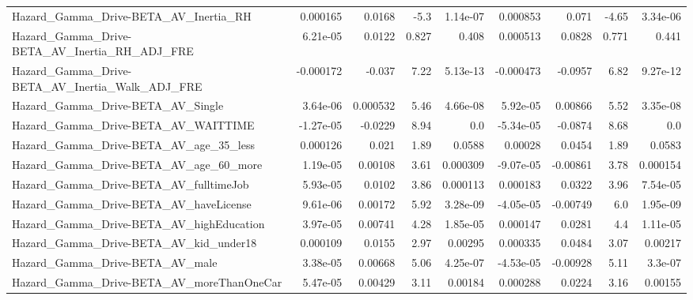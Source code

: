 \begin{tabular}{lrrrrrrrr}
Hazard\_Gamma\_Drive-BETA\_AV\_Inertia\_RH              &    0.000165 &       0.0168 &     -5.3 & 1.14e-07 &   0.000853 &       0.071 &        -4.65 &      3.34e-06 \\
Hazard\_Gamma\_Drive-BETA\_AV\_Inertia\_RH\_ADJ\_FRE      &    6.21e-05 &       0.0122 &    0.827 &    0.408 &   0.000513 &      0.0828 &        0.771 &         0.441 \\
Hazard\_Gamma\_Drive-BETA\_AV\_Inertia\_Walk\_ADJ\_FRE    &   -0.000172 &       -0.037 &     7.22 & 5.13e-13 &  -0.000473 &     -0.0957 &         6.82 &      9.27e-12 \\
Hazard\_Gamma\_Drive-BETA\_AV\_Single                  &    3.64e-06 &     0.000532 &     5.46 & 4.66e-08 &   5.92e-05 &     0.00866 &         5.52 &      3.35e-08 \\
Hazard\_Gamma\_Drive-BETA\_AV\_WAITTIME                &   -1.27e-05 &      -0.0229 &     8.94 &      0.0 &  -5.34e-05 &     -0.0874 &         8.68 &           0.0 \\
Hazard\_Gamma\_Drive-BETA\_AV\_age\_35\_less             &    0.000126 &        0.021 &     1.89 &   0.0588 &    0.00028 &      0.0454 &         1.89 &        0.0583 \\
Hazard\_Gamma\_Drive-BETA\_AV\_age\_60\_more             &    1.19e-05 &      0.00108 &     3.61 & 0.000309 &  -9.07e-05 &    -0.00861 &         3.78 &      0.000154 \\
Hazard\_Gamma\_Drive-BETA\_AV\_fulltimeJob             &    5.93e-05 &       0.0102 &     3.86 & 0.000113 &   0.000183 &      0.0322 &         3.96 &      7.54e-05 \\
Hazard\_Gamma\_Drive-BETA\_AV\_haveLicense             &    9.61e-06 &      0.00172 &     5.92 & 3.28e-09 &  -4.05e-05 &    -0.00749 &          6.0 &      1.95e-09 \\
Hazard\_Gamma\_Drive-BETA\_AV\_highEducation           &    3.97e-05 &      0.00741 &     4.28 & 1.85e-05 &   0.000147 &      0.0281 &          4.4 &      1.11e-05 \\
Hazard\_Gamma\_Drive-BETA\_AV\_kid\_under18             &    0.000109 &       0.0155 &     2.97 &  0.00295 &   0.000335 &      0.0484 &         3.07 &       0.00217 \\
Hazard\_Gamma\_Drive-BETA\_AV\_male                    &    3.38e-05 &      0.00668 &     5.06 & 4.25e-07 &  -4.53e-05 &    -0.00928 &         5.11 &       3.3e-07 \\
Hazard\_Gamma\_Drive-BETA\_AV\_moreThanOneCar          &    5.47e-05 &      0.00429 &     3.11 &  0.00184 &   0.000288 &      0.0224 &         3.16 &       0.00155 \\

\end{tabular}
